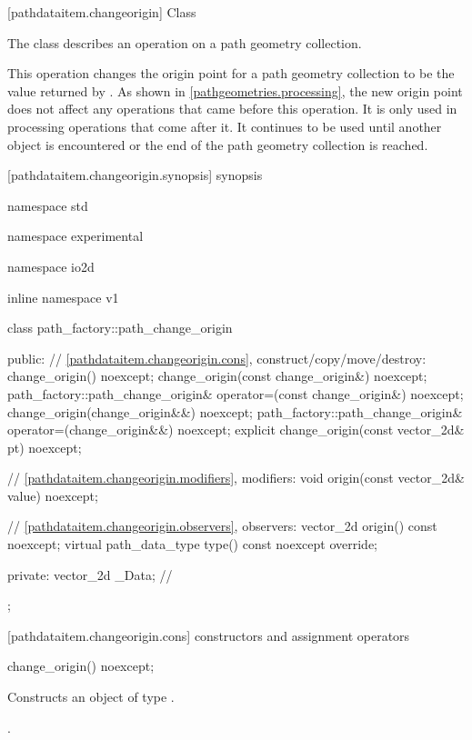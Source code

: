  [pathdataitem.changeorigin] {Class }

\pnum
{}
The class  describes an operation on a path geometry collection.

\pnum
This operation changes the origin point for a path geometry collection to be the value returned by . As shown in \ref{pathgeometries.processing}, the new origin point does not affect any operations that came before this operation. It is only used in processing operations that come after it. It continues to be used until another  object is encountered or the end of the path geometry collection is reached.

 [pathdataitem.changeorigin.synopsis] { synopsis}

\begin{codeblock}
namespace std { namespace experimental { namespace io2d { inline namespace v1 {
  class path_factory::path_change_origin {
  public:
    // \ref{pathdataitem.changeorigin.cons}, construct/copy/move/destroy:
    change_origin() noexcept;
    change_origin(const change_origin&) noexcept;
    path_factory::path_change_origin& operator=(const change_origin&) noexcept;
    change_origin(change_origin&&) noexcept;
    path_factory::path_change_origin& operator=(change_origin&&) noexcept;
    explicit change_origin(const vector_2d& pt) noexcept;

    // \ref{pathdataitem.changeorigin.modifiers}, modifiers:
    void origin(const vector_2d& value) noexcept;

    // \ref{pathdataitem.changeorigin.observers}, observers:
    vector_2d origin() const noexcept;
    virtual path_data_type type() const noexcept override;
    
  private:
    vector_2d _Data; // \expos
  };
} } } }
\end{codeblock}

 [pathdataitem.changeorigin.cons] { constructors and assignment operators}

\begin{itemdecl}
    change_origin() noexcept;
\end{itemdecl}
\begin{itemdescr}
	\pnum
	\effects
	Constructs an object of type .
	
	\pnum
	\postconditions
	.
\end{itemdescr}

